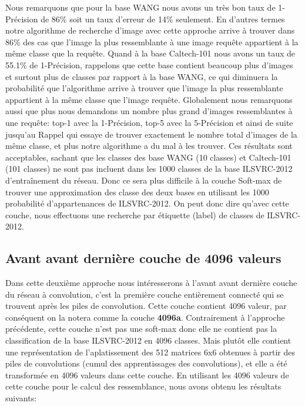 	Nous remarquons que pour la base WANG nous avons un très bon taux de 1-Précision de 86\% soit un taux d'erreur de 14\% seulement. En d'autres termes notre algorithme de recherche d'image avec cette approche arrive à trouver dans 86\% des cas que l'image la plus ressemblante à une image requête appartient à la même classe que la requête. Quand à la base Caltech-101 nous avons un taux de 55.1\% de 1-Précision, rappelons que cette base contient beaucoup plus d'images et surtout plus de classes par rapport à la base WANG, ce qui diminuera la probabilité que l'algorithme arrive à trouver que l'image la plus ressemblante appartient à la même classe que l'image requête.
	Globalement nous remarquons aussi que plus nous demandons un nombre plus grand d'images ressemblantes à une requête: top-1 avec la 1-Précision, top-5 avec la 5-Précision et ainsi de suite jusqu'au Rappel qui essaye de trouver exactement le nombre total d'images de la même classe, et plus notre algorithme a du mal à les trouver.
	Ces résultats sont acceptables, sachant que les classes des base WANG (10 classes) et Caltech-101 (101 classes) ne sont pas incluent dans les 1000 classes de la base ILSVRC-2012 d’entraînement du réseau. Donc ce sera plus difficile à la couche Soft-max de trouver une approximation des classe des deux bases en utilisant les 1000 probabilité d'appartenances de ILSVRC-2012.
	On peut donc dire qu'avec cette couche, nous effectuons une recherche par étiquette (label) de classes de ILSVRC-2012. 





\subsection{Avant avant dernière couche de 4096 valeurs} 
	Dans cette deuxième approche nous intéresserons à l'avant avant dernière couche du réseau à convolution, c'est la première couche entièrement connecté qui se trouvent après les piles de convolution. Cette couche contient 4096 valeur, par conséquent on la notera comme la couche \textbf{4096a}. Contrairement à l'approche précédente, cette couche n'est pas une soft-max donc elle ne contient pas la classification de la base ILSVRC-2012 en 4096 classes. Mais plutôt elle contient une représentation de l’aplatissement des 512 matrices 6x6 obtenues à partir des piles de convolutions (cumul des apprentissages des convolutions), et elle a été transformée en 4096 valeurs dans cette couche. En utilisant les 4096 valeurs de cette couche pour le calcul des ressemblance, nous avons obtenu les résultats suivants:

